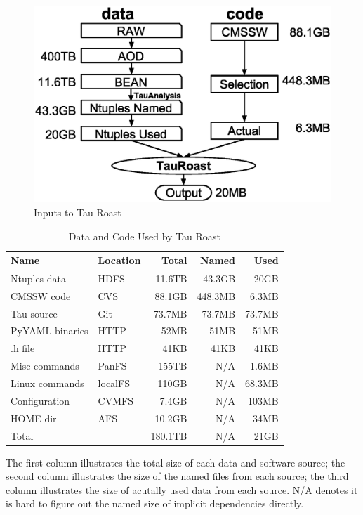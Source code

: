 \documentclass{acm_proc_article-sp}
\begin{document}
\begin{figure}[t]
\centering
\includegraphics[width=.8\columnwidth]{data-code-size.eps}
\caption{Inputs to Tau Roast}
\label{fig:data-code-size}
\end{figure}

\begin{table}[t]
    \centering
    \small
    \begin{tabular}{|l|l|r|r|r|}
        \hline
        \bf Name & \bf Location & \bf Total & \bf Named & \bf Used \\ 
        \hline
        Ntuples data    & HDFS& 11.6TB & 43.3GB & 20GB \\ \hline
        CMSSW code     & CVS & 88.1GB & 448.3MB & 6.3MB\\ \hline
        Tau source       & Git & 73.7MB & 73.7MB & 73.7MB \\ \hline
        PyYAML binaries    & HTTP & 52MB & 51MB & 51MB \\ \hline
        .h file       & HTTP& 41KB & 41KB & 41KB \\ \hline
        Misc commands & PanFS & 155TB & N/A  & 1.6MB \\ \hline
        Linux commands & localFS & 110GB &  N/A & 68.3MB \\ \hline     
        Configuration & CVMFS & 7.4GB & N/A & 103MB \\ \hline
        HOME dir& AFS &10.2GB & N/A & 34MB\\ \hline
        Total      &    & 180.1TB            & N/A & 21GB \\ \hline
    \end{tabular}
    \begin{tablenotes}
      \small
      \item The first column illustrates the total size of each data and software source; 
            the second column illustrates the size of the named files from each source;
            the third column illustrates the size of acutally used data from each source.
            N/A denotes it is hard to figure out the named size of implicit dependencies directly.        
    \end{tablenotes}
    \caption{Data and Code Used by Tau Roast}
    \label{table:size-original-real}
\end{table}
\end{document}
